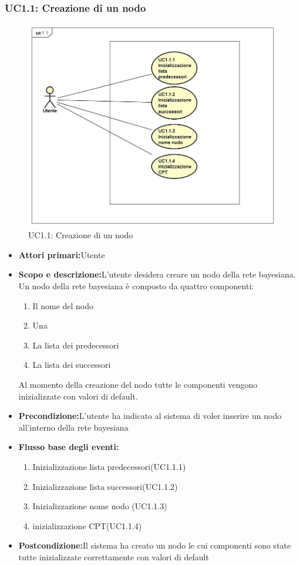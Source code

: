 \subsubsection{UC1.1: Creazione di un nodo}
\begin{figure} [H]
	\centering
	\includegraphics[scale=0.45]{Img/UC1-1}
	\caption{UC1.1: Creazione di un nodo}\label{}
\end{figure}
\begin{itemize}
	\item{\textbf{Attori primari:}Utente}
	\item{\textbf{Scopo e descrizione:}L'utente desidera creare un nodo della rete bayesiana. Un nodo della rete bayesiana è composto da quattro componenti:
	\begin{enumerate}
		\item{Il nome del nodo}
		\item{Una }
		\item{La lista dei predecessori}
		\item{La lista dei successori}
	\end{enumerate}
Al momento della creazione del nodo tutte le componenti vengono inizializzate con valori di default.}
	\item{\textbf{Precondizione:}L'utente ha indicato al sistema di voler inserire un nodo all'interno della rete bayesiana}
	\item{\textbf{Flusso base degli eventi:}}
		\begin{enumerate}
			\item{Inizializzazione lista predecessori(UC1.1.1)}
			\item{Inizializzazione lista successori(UC1.1.2)}
			\item{Inizializzazione nome nodo (UC1.1.3)}
			\item{inizializzazione CPT(UC1.1.4)}
		\end{enumerate}
	\item{\textbf{Postcondizione:}Il sistema ha creato un nodo le cui componenti sono state tutte inizializzate correttamente con valori di default}
\end{itemize}
